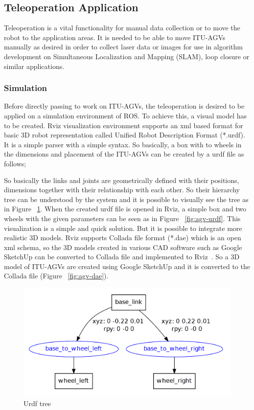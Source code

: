 	\subsection{Teleoperation Application}
	\label{subsec:teleop app}
	Teleoperation is a vital functionality for manual data collection or to move the robot to the application areas. It is needed to be able to move ITU-AGVs manually as desired in order to collect laser data or images for use in algorithm development on Simultaneous Localization and Mapping (SLAM), loop closure or similar applications. 
		\subsubsection{Simulation}
		\label{subsec:simulation}
		Before directly passing to work on ITU-AGVs, the teleoperation is desired to be applied on a simulation environment of ROS. To achieve this, a visual model has to be created. Rviz visualization environment supports an xml based format for basic 3D robot representation called Unified Robot Description Format (*.urdf). It is a simple parser with a simple syntax. So basically, a box with to wheels in the dimensions and placement of the ITU-AGVs can be created by a urdf file as follows;
		
		So basically the links and joints are geometrically defined with their positions, dimensions together with their relationship with each other. So their hierarchy tree can be understood by the system and it is possible to visually see the tree as in Figure ~\ref{fig:urdfTree}. When the created urdf file is opened in Rviz, a simple box and two wheels with the given parameters can be seen as in Figure ~\ref{fig:agv-urdf}. This visualization is a simple and quick solution. But it is possible to integrate more realistic 3D models. Rviz supports Collada file format (*.dae) which is an open xml schema, so the 3D models created in various CAD software such as Google SketchUp can be converted to Collada file and implemented to Rviz~\cite{Martinez-Ros}. So a 3D model of ITU-AGVs are created using Google SketchUp and it is converted to the Collada file (Figure ~\ref{fig:agv-dae}).
		\begin{figure}[h]
			\centering
			\includegraphics[scale=0.3]{images/urdfTree}
			\caption{Urdf tree}
			\label{fig:urdfTree}
		\end{figure}
		
